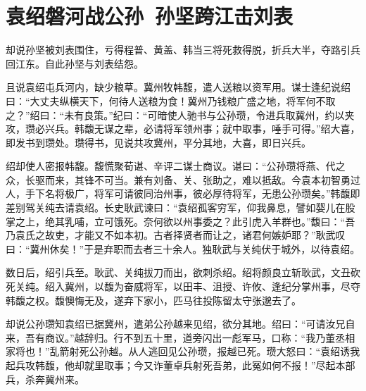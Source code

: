 \chapter{袁绍磐河战公孙~孙坚跨江击刘表}

却说孙坚被刘表围住，亏得程普、黄盖、韩当三将死救得脱，折兵大半，夺路引兵回江东。自此孙坚与刘表结怨。

且说袁绍屯兵河内，缺少粮草。冀州牧韩馥，遣人送粮以资军用。谋士逢纪说绍曰：“大丈夫纵横天下，何待人送粮为食！冀州乃钱粮广盛之地，将军何不取之？”绍曰：“未有良策。”纪曰：“可暗使人驰书与公孙瓒，令进兵取冀州，约以夹攻，瓒必兴兵。韩馥无谋之辈，必请将军领州事；就中取事，唾手可得。”绍大喜，即发书到瓒处。瓒得书，见说共攻冀州，平分其地，大喜，即日兴兵。

绍却使人密报韩馥。馥慌聚荀谌、辛评二谋士商议。谌曰：“公孙瓒将燕、代之众，长驱而来，其锋不可当。兼有刘备、关、张助之，难以抵敌。今袁本初智勇过人，手下名将极广，将军可请彼同治州事，彼必厚待将军，无患公孙瓒矣。”韩馥即差别驾关纯去请袁绍。长史耿武谏曰：“袁绍孤客穷军，仰我鼻息，譬如婴儿在股掌之上，绝其乳哺，立可饿死。奈何欲以州事委之？此引虎入羊群也。”馥曰：“吾乃袁氏之故吏，才能又不如本初。古者择贤者而让之，诸君何嫉妒耶？”耿武叹曰：“冀州休矣！”于是弃职而去者三十余人。独耿武与关纯伏于城外，以待袁绍。

数日后，绍引兵至。耿武、关纯拔刀而出，欲刺杀绍。绍将颜良立斩耿武，文丑砍死关纯。绍入冀州，以馥为奋威将军，以田丰、沮授、许攸、逢纪分掌州事，尽夺韩馥之权。馥懊悔无及，遂弃下家小，匹马往投陈留太守张邈去了。

却说公孙瓒知袁绍已据冀州，遣弟公孙越来见绍，欲分其地。绍曰：“可请汝兄自来，吾有商议。”越辞归。行不到五十里，道旁闪出一彪军马，口称：“我乃董丞相家将也！”乱箭射死公孙越。从人逃回见公孙瓒，报越已死。瓒大怒曰：“袁绍诱我起兵攻韩馥，他却就里取事；今又诈董卓兵射死吾弟，此冤如何不报！”尽起本部兵，杀奔冀州来。

